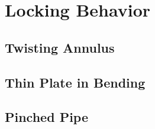 	\section{Locking Behavior}

		\subsection{Twisting Annulus}

		\subsection{Thin Plate in Bending}

		\subsection{Pinched Pipe}

